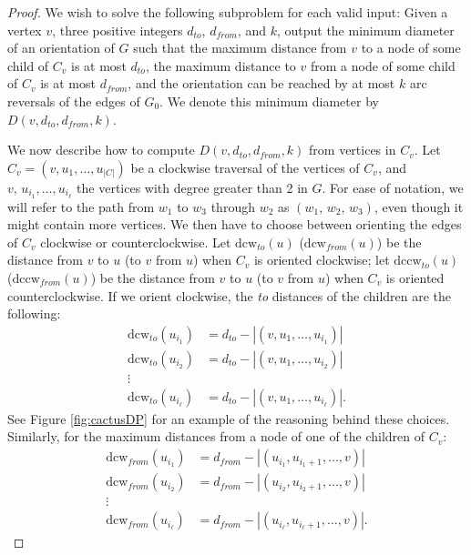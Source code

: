 \documentclass[11pt, twoside]{article}
\numberwithin{equation}{section}
\numberwithin{table}{section}
\numberwithin{figure}{section}
\theoremstyle{definition}
\theoremstyle{definition}
\theoremstyle{definition}
\begin{document}
\begin{appendices}
\begin{proof}
	We wish to solve the following subproblem for each valid input:	
	Given a vertex $ v $, three positive integers $ d_{to} $, $ d_{from} $, and $k$, output the minimum diameter of an orientation of $ G $ such that the maximum distance from $ v $ to a node of some child of $ C_v $ is at most $ d_{to} $, the maximum distance to $ v $ from a node of some child of $ C_v $ is at most $ d_{from} $, and the orientation can be reached by at most $k$ arc reversals of the edges of $G_0$. We denote this minimum diameter by $ D(v, d_{to}, d_{from}, k) $.
	
	We now describe how to compute $ D(v, d_{to}, d_{from},k) $ from vertices in $ C_v $. Let $ C_v=(v,u_1,\ldots, u_{|C|}) $ be a clockwise traversal of the vertices of $ C_v $, and $v, \, u_{i_1},\ldots,u_{i_\ell}$ the vertices with degree greater than 2 in $G$. For ease of notation, we will refer to the path from $w_{1}$ to $w_{3}$ through $w_{2}$ as $(w_{1}, \, w_{2}, \, w_{3})$, even though it might contain more vertices. 
 We then have to choose between orienting the edges of $ C_v $ clockwise or counterclockwise. 
 Let $\text{dcw}_{to}(u)$ ($\text{dcw}_{from}(u)$) be the distance from $v$ to $u$ (to $v$ from $u$) when $C_v$ is oriented clockwise; let $\text{dccw}_{to}(u)$ ($\text{dccw}_{from}(u)$) be the distance from $v$ to $u$ (to $v$ from $u$) when $C_v$ is oriented counterclockwise. 
 If we orient clockwise, the \emph{to} distances of the children are the following:
	\begin{align*}
		\text{dcw}_{to}(u_{i_1}) &= d_{to}- |(v,u_1,\ldots,u_{i_1})|\\
		\text{dcw}_{to}(u_{i_2}) &= d_{to}- |(v,u_1,\ldots,u_{i_2})|\\
		\vdots\\
		\text{dcw}_{to}(u_{i_\ell}) &= d_{to}- |(v,u_1,\ldots,u_{i_\ell})|.
	\end{align*}
 See Figure \ref{fig:cactusDP} for an example of the reasoning behind these choices.
Similarly, for the maximum distances from a node of one of the children of $ C_v $:
		\begin{align*}
		\text{dcw}_{from}(u_{i_1}) &= d_{from}- |(u_{i_1},u_{i_1+1},\ldots, v)|\\
		\text{dcw}_{from}(u_{i_2}) &= d_{from}- |(u_{i_2},u_{i_2+1},\ldots, v)|\\
		\vdots\\
		\text{dcw}_{from}(u_{i_\ell}) &= d_{from}- |(u_{i_\ell},u_{i_\ell+1},\ldots, v)|.
	\end{align*}


\end{proof}
\end{appendices}
\end{document}
